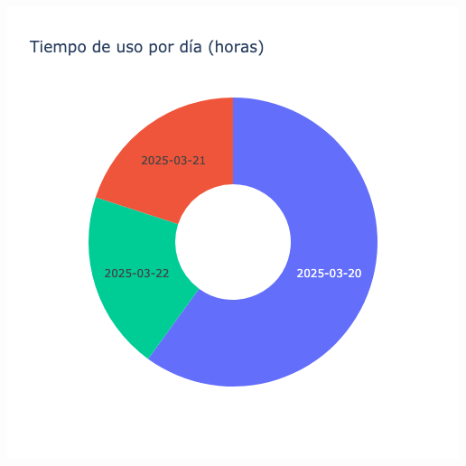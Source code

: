 \documentclass{article}
\begin{document}
    \begin{minipage}{0.48\textwidth}
        \centering
        \includegraphics[width=\textwidth]{../img/pie/UD102-180Dias-17-04-2025.png}
    \end{minipage}
    
\end{document}
